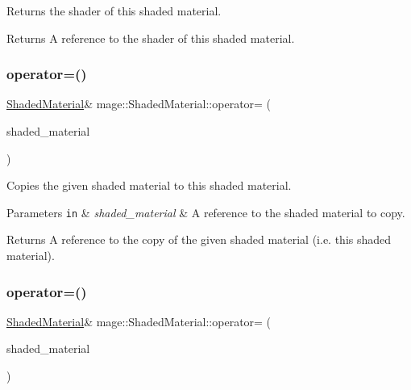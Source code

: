 Returns the shader of this shaded material.

\begin{DoxyReturn}{Returns}
A reference to the shader of this shaded material. 
\end{DoxyReturn}
\hypertarget{structmage_1_1_shaded_material_ade9ec3ee6aae198e695240a5b89a0d72}{}\label{structmage_1_1_shaded_material_ade9ec3ee6aae198e695240a5b89a0d72} 
\subsubsection{\texorpdfstring{operator=()}{operator=()}\hspace{0.1cm}{\footnotesize\ttfamily [1/2]}}
{\footnotesize\ttfamily \hyperlink{structmage_1_1_shaded_material}{Shaded\+Material}\& mage\+::\+Shaded\+Material\+::operator= (\begin{DoxyParamCaption}\item[{const \hyperlink{structmage_1_1_shaded_material}{Shaded\+Material} \&}]{shaded\+\_\+material }\end{DoxyParamCaption})\hspace{0.3cm}{\ttfamily [default]}}

Copies the given shaded material to this shaded material.


\begin{DoxyParams}[1]{Parameters}
\mbox{\tt in}  & {\em shaded\+\_\+material} & A reference to the shaded material to copy. \\
\hline
\end{DoxyParams}
\begin{DoxyReturn}{Returns}
A reference to the copy of the given shaded material (i.\+e. this shaded material). 
\end{DoxyReturn}
\hypertarget{structmage_1_1_shaded_material_a29fb482ab140fcb47709ffda03a67714}{}\label{structmage_1_1_shaded_material_a29fb482ab140fcb47709ffda03a67714} 
\subsubsection{\texorpdfstring{operator=()}{operator=()}\hspace{0.1cm}{\footnotesize\ttfamily [2/2]}}
{\footnotesize\ttfamily \hyperlink{structmage_1_1_shaded_material}{Shaded\+Material}\& mage\+::\+Shaded\+Material\+::operator= (\begin{DoxyParamCaption}\item[{\hyperlink{structmage_1_1_shaded_material}{Shaded\+Material} \&\&}]{shaded\+\_\+material }\end{DoxyParamCaption})\hspace{0.3cm}{\ttfamily [default]}}

